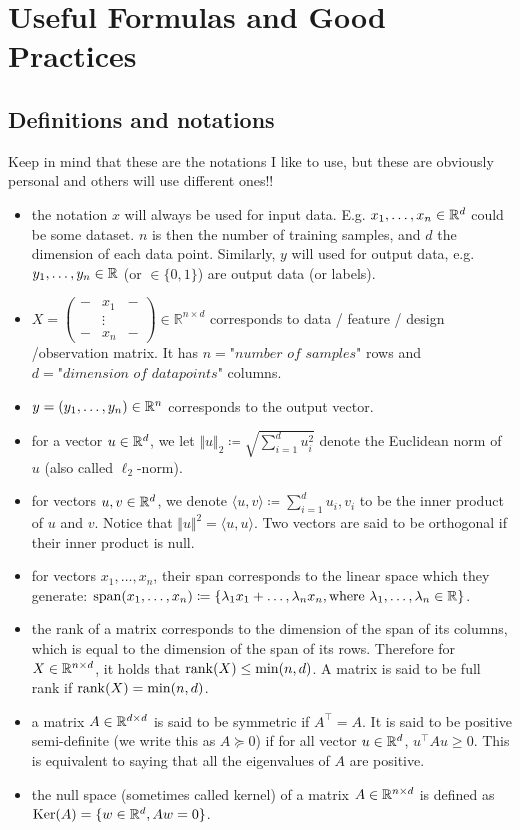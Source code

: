 \section{Useful Formulas and Good Practices}

\subsection{Definitions and notations}

Keep in mind that these are the notations I like to use, but these are obviously personal and others will use different ones!!
\begin{itemize}
    \item the notation $x$ will always be used for input data. E.g. $x_1, \dots, x_n \in \mathbb{R}^d$ could be some dataset. $n$ is then the number of training samples, and $d$ the dimension of each data point. Similarly, $y$ will used for output data, e.g. $y_1, \dots, y_n \in \mathbb{R}$ (or $\in \{0, 1\}$) are output data (or labels).
    \item $X = \begin{pmatrix}
- & x_1 & - \\
  & \vdots &  \\
- & x_n & -
\end{pmatrix}
\in \mathbb{R}^{n \times d}$ corresponds to data / feature / design /observation matrix. It has $n = \textit{"number \ of \ samples"}$ rows and $d = \textit{"dimension \ of \ datapoints"}$ columns.
    \item $y = (y_1, \dots, y_n) \in \mathbb{R}^{n}$ corresponds to the output vector.
    \item for a vector $u \in \mathbb{R}^d$, we let $\Vert u \Vert_2 \coloneqq \sqrt{\sum_{i = 1}^d u_i^2}$ denote the Euclidean norm of $u$ (also called $\ell_2$-norm).
    \item for vectors $u, v \in \mathbb{R}^d$, we denote $\langle u, v \rangle \coloneqq \sum_{i = 1}^d u_i, v_i$ to be the inner product of $u$ and $v$. Notice that $\Vert u \Vert^2 = \langle u, u \rangle$. Two vectors are said to be orthogonal if their inner product is null.
    \item for vectors $x_1, \dots, x_n$, their span corresponds to the linear space which they generate: $\mathrm{span}(x_1, \dots, x_n) \coloneqq \{ \lambda_1 x_1 + \dots, \lambda_n x_n , \text{where} \  \lambda_1, \dots, \lambda_n \in \mathbb{R} \}$.
    \item the rank of a matrix corresponds to the dimension of the span of its columns, which is equal to the dimension of the span of its rows. Therefore for $X \in \mathbb{R}^{n \times d}$, it holds that $\rank(X) \leq \min(n, d)$. A matrix is said to be full rank if $\rank(X) = \min(n, d)$.
    \item a matrix $A \in \mathbb{R}^{d \times d}$ is said to be symmetric if $A^{\top} = A$. It is said to be positive semi-definite (we write this as  $A \succeq 0$) if for all vector $u \in \mathbb{R}^d$, $u^\top A u \geq 0$. This is equivalent to saying that all the eigenvalues of $A$ are positive.
    \item the null space (sometimes called kernel) of a matrix $A \in \mathbb{R}^{n \times d}$ is defined as $\mathrm{Ker}(A) = \{ w \in \mathbb{R}^d, A w = 0 \}$. 
\end{itemize}

